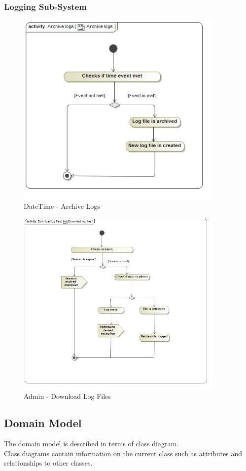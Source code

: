\documentclass{article}
\begin{document}
			\subsubsection{Logging Sub-System}
				\begin{figure}[H]
					\includegraphics[width=4in, center]{../Diagrams/Process Specifications/Logging subsystem/Archive Logs.jpg}
					\caption{DateTime - Archive Logs}
				\end{figure}
				\begin{figure}[H]
					\includegraphics[width=4in, center]{../Diagrams/Process Specifications/Logging subsystem/Download log files.jpg}
					\caption{Admin - Download Log Files}
				\end{figure}
			
		\cleardoublepage
		\subsection{Domain Model}\label{subsec:domainmodel}
		The domain model is described in terms of class diagram.\\ Class diagrams contain information on the current class such as attributes and relationships to other classes.
		
\end{document}
